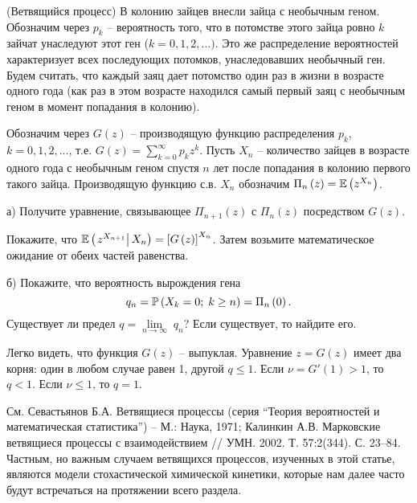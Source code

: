 \begin{problem}(Ветвящийся процесс)
В колонию зайцев внесли зайца с необычным геном. Обозначим через $p_k $ -- вероятность того, что в потомстве 
этого зайца ровно $k$ зайчат унаследуют этот ген ($k=0,1,2,\ldots)$. Это же 
распределение вероятностей характеризует всех последующих потомков, 
унаследовавших необычный ген. Будем считать, что каждый заяц дает потомство 
один раз в жизни в возрасте одного года (как раз в этом возрасте находился 
самый первый заяц с необычным геном в момент попадания в колонию).

Обозначим через $G\left( z \right)$ -- производящую функцию распределения 
$p_k $, $k=0,1,2,...$, т.е. $G\left( z \right)=\sum\limits_{k=0}^\infty {p_k 
z^k} $. Пусть $X_n $ -- количество зайцев в возрасте одного года с необычным 
геном спустя $n$ лет после попадания в колонию первого такого зайца. 
Производящую функцию с.в. $X_n $ обозначим $\Pi _n \left( z \right)=\mathrm{{\mathbb E}}\left( 
{z^{X_n }} \right)$.

а) Получите уравнение, связывающее $\Pi _{n+1} \left( z \right)$ с 
$\Pi _n \left( z \right)$ посредством $G\left( z \right)$.

\begin{ordre}
Покажите, что $\mathrm{{\mathbb E}}\left( {\left. {z^{X_{n+1} }} \right|X_n 
} \right)=\left[ {G\left( z \right)} \right]^{X_n }$. Затем возьмите 
математическое ожидание от обеих частей равенства.
\end{ordre}

б) Покажите, что вероятность вырождения гена \[q_n =\mathrm{{\mathbb P}}\left( {X_k 
=0;\;k\ge n} \right)=\Pi _n \left( 0 \right).\] Существует ли предел 
$q=\mathop {\lim }\limits_{n\to \infty } \;q_n $? Если существует, то 
найдите его.

\begin{ordre}
Легко видеть, что функция $G\left( z \right)$ -- 
выпуклая. Уравнение $z=G\left( z \right)$ имеет два корня: один в любом 
случае равен 1, другой $q\le 1$. Если $\nu ={G}'\left( 1 \right)>1$, то 
$q<1$. Если $\nu \le 1$, то $q=1$.
\end{ordre}

\end{problem}

\begin{remark}
См. Севастьянов Б.А. Ветвящиеся процессы (серия ``Теория вероятностей и 
математическая статистика'') -- М.: Наука, 1971; Калинкин А.В. Марковские ветвящиеся 
процессы с взаимодействием // УМН. 2002. Т. 57:2(344). С. 23--84. Частным, 
но важным случаем ветвящихся процессов, изученных в этой статье, являются 
модели стохастической химической кинетики, которые нам далее часто будут 
встречаться на протяжении всего раздела.
\end{remark}

